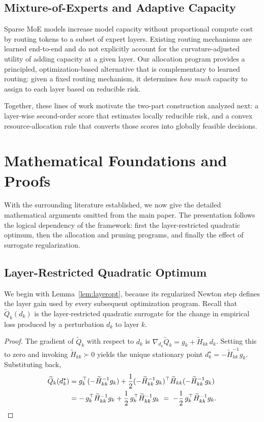 \documentclass[accepted]{uai2026}%
\theoremstyle{remark}%
\begin{document}
\subsection{Mixture-of-Experts and Adaptive Capacity}
Sparse MoE models \citet{shazeer2017outrageously, fedus2022switch}
increase model capacity without proportional compute cost by routing
tokens to a subset of expert layers.
Existing routing mechanisms are learned end-to-end and do not
explicitly account for the curvature-adjusted utility of adding
capacity at a given layer.
Our allocation program provides a principled, optimization-based
alternative that is complementary to learned routing: given a fixed
routing mechanism, it determines \emph{how much} capacity to assign
to each layer based on reducible risk.


Together, these lines of work motivate the two-part construction analyzed next:
a layer-wise second-order score that estimates locally reducible risk, and a
convex resource-allocation rule that converts those scores into globally
feasible decisions.

\section{Mathematical Foundations and Proofs}
\label{app:proofs}
With the surrounding literature established, we now give the detailed
mathematical arguments omitted from the main paper. The presentation follows
the logical dependency of the framework: first the layer-restricted quadratic
optimum, then the allocation and pruning programs, and finally the effect of
surrogate regularization.

\subsection{Layer-Restricted Quadratic Optimum}
\label{proof:lemma1}
We begin with Lemma~\ref{lem:layeropt}, because its regularized Newton step
defines the layer gain used by every subsequent optimization program.
Recall that $\widetilde Q_k(d_k)$ is the layer-restricted quadratic surrogate for
the change in empirical loss produced by a perturbation $d_k$ to layer $k$.
\begin{proof}
  The gradient of $\widetilde{Q}_k$ with respect to $d_k$ is
  $\nabla_{d_k}\widetilde{Q}_k = g_k + \widetilde{H}_{kk}\,d_k$.
  Setting this to zero and invoking $\widetilde{H}_{kk} \succ 0$ yields the unique
  stationary point $d_k^{\star} = -\widetilde{H}_{kk}^{-1}g_k$.
  Substituting back,
  \begin{align*}
    \widetilde{Q}_k(d_k^{\star})
    &= g_k^{\top}(-\widetilde{H}_{kk}^{-1}g_k)
      + \frac{1}{2}(-\widetilde{H}_{kk}^{-1}g_k)^{\top}
        \widetilde{H}_{kk}
        (-\widetilde{H}_{kk}^{-1}g_k) \\
    &= -\,g_k^{\top}\widetilde{H}_{kk}^{-1}g_k
      + \frac{1}{2}\,g_k^{\top}\widetilde{H}_{kk}^{-1}g_k
    \;=\;
    -\frac{1}{2}\,g_k^{\top}\widetilde{H}_{kk}^{-1}g_k. \qedhere
  \end{align*}
\end{proof}
\end{document}
